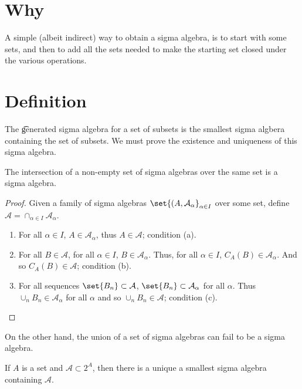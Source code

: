 
\section*{Why}

A simple (albeit indirect) way to obtain a sigma algebra, is to start with some sets, and then to add all the sets needed to make the starting set closed under the various operations.

\section*{Definition}

The \t{generated sigma algebra} for a set of subsets is the smallest sigma algbera containing the set of subsets.
We must prove the existence and uniqueness of this sigma algebra.

\begin{proposition}

\label{intersectsigmalgebras}The intersection of a non-empty set of sigma algebras over the same set is a sigma algebra.
\end{proposition}

\begin{proof}Given a family of sigma algebras $\set{(A, \mathcal{A} _\alpha }_{\alpha  \in I}$ over some set, define $\mathcal{A}  = \cap _{\alpha  \in I} \mathcal{A} _\alpha $.
  \begin{enumerate}
    \item For all $\alpha  \in I$, $A \in \mathcal{A} _{\alpha }$, thus $A \in \mathcal{A} $; condition (a).
    \item For all $B \in \mathcal{A} $, for all $\alpha  \in I$, $B \in \mathcal{A} _{\alpha }$.
Thus, for all $\alpha  \in I$, $C_{A}(B) \in \mathcal{A} _{\alpha }$.
And so $C_{A}(B) \in \mathcal{A} $; condition (b).
    \item For all sequences $\set{B_n} \subset \mathcal{A} $, $\set{B_n} \subset \mathcal{A} _{\alpha }$ for all $\alpha $.
Thus $\cup_{n} B_n \in \mathcal{A} _{\alpha }$ for all $\alpha $ and so $\cup_{n} B_n \in \mathcal{A} $; condition (c).
  \end{enumerate}\end{proof}
On the other hand, the union of a set of sigma algebras can fail to be a sigma algebra.

\begin{proposition}
If $A$ is a set and $\mathcal{A}  \subset 2^A$, then there is a unique a smallest sigma algebra containing $\mathcal{A} $.
\end{proposition}

